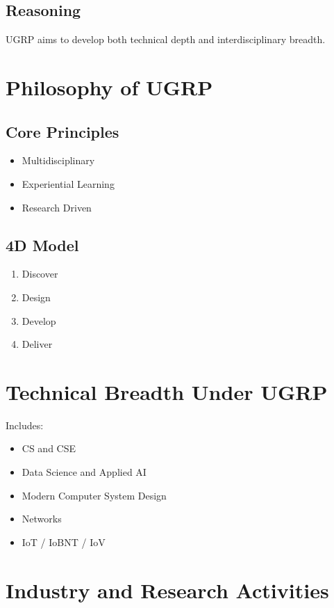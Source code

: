 \documentclass[12pt]{article}
\begin{document}
\subsection{Reasoning}
UGRP aims to develop both technical depth and interdisciplinary breadth.

\section{Philosophy of UGRP}

\subsection{Core Principles}
\begin{itemize}
    \item Multidisciplinary
    \item Experiential Learning
    \item Research Driven
\end{itemize}

\subsection{4D Model}
\begin{enumerate}
    \item Discover
    \item Design
    \item Develop
    \item Deliver
\end{enumerate}

\section{Technical Breadth Under UGRP}

Includes:
\begin{itemize}
    \item CS and CSE
    \item Data Science and Applied AI
    \item Modern Computer System Design
    \item Networks
    \item IoT / IoBNT / IoV
\end{itemize}

\section{Industry and Research Activities}
\end{document}
